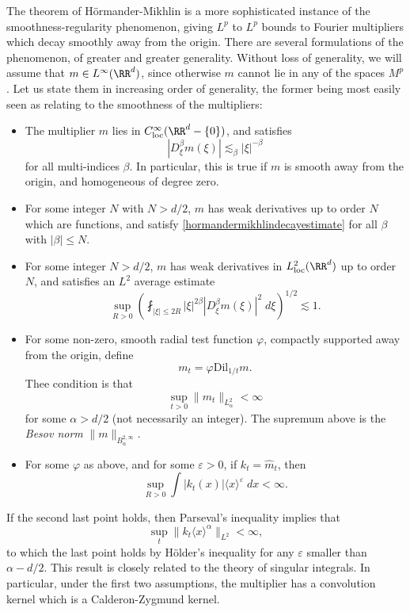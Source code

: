 The theorem of H\"{o}rmander-Mikhlin is a more sophisticated instance of the smoothness-regularity phenomenon, giving $L^p$ to $L^p$ bounds to Fourier multipliers which decay smoothly away from the origin. There are several formulations of the phenomenon, of greater and greater generality. Without loss of generality, we will assume that $m \in L^\infty(\RR^d)$, since otherwise $m$ cannot lie in any of the spaces $M^p$. Let us state them in increasing order of generality, the former being most easily seen as relating to the smoothness of the multipliers:
%
\begin{itemize}
    \item The multiplier $m$ lies in $C^\infty_{\text{loc}}(\RR^d - \{ 0 \})$, and satisfies
    \begin{equation} \label{hormandermikhlindecayestimate}
        |D^\beta_\xi m(\xi)| \lesssim_\beta |\xi|^{-\beta}
    \end{equation}
    for all multi-indices $\beta$. In particular, this is true if $m$ is smooth away from the origin, and homogeneous of degree zero.

    \item For some integer $N$ with $N > d/2$, $m$ has weak derivatives up to order $N$ which are functions, and satisfy \eqref{hormandermikhlindecayestimate} for all $\beta$ with $|\beta| \leq N$.

    \item For some integer $N > d/2$, $m$ has weak derivatives in $L^2_{\text{loc}}(\RR^d)$ up to order $N$, and satisfies an $L^2$ average estimate
    \[ \sup_{R > 0} \left( \fint_{|\xi| \leq 2R} |\xi|^{2\beta} |D^\beta_\xi m(\xi)|^2\; d\xi \right)^{1/2} \lesssim 1. \]

    \item For some non-zero, smooth radial test function $\varphi$, compactly supported away from the origin, define
    \[ m_t = \varphi \text{Dil}_{1/t} m. \]
    Thee condition is that
    \begin{equation}
        \sup_{t > 0} \| m_t \|_{L^2_\alpha} < \infty
    \end{equation}
    for some $\alpha > d/2$ (not necessarily an integer). The supremum above is the \emph{Besov norm} $\| m \|_{B_\alpha^{2,\infty}}$.

    \item For some $\varphi$ as above, and for some $\varepsilon > 0$, if $k_t = \widehat{m}_t$, then
    \[ \sup_{R > 0} \int |k_t(x)| \langle x \rangle^\varepsilon\; dx < \infty.  \]
\end{itemize}
%
If the second last point holds, then Parseval's inequality implies that
%
\[ \sup_t \| k_t \langle x \rangle^\alpha \|_{L^2} < \infty, \]
%
to which the last point holds by H\"{o}lder's inequality for any $\varepsilon$ smaller than $\alpha - d/2$. This result is closely related to the theory of singular integrals. In particular, under the first two assumptions, the multiplier has a convolution kernel which is a Calderon-Zygmund kernel.

